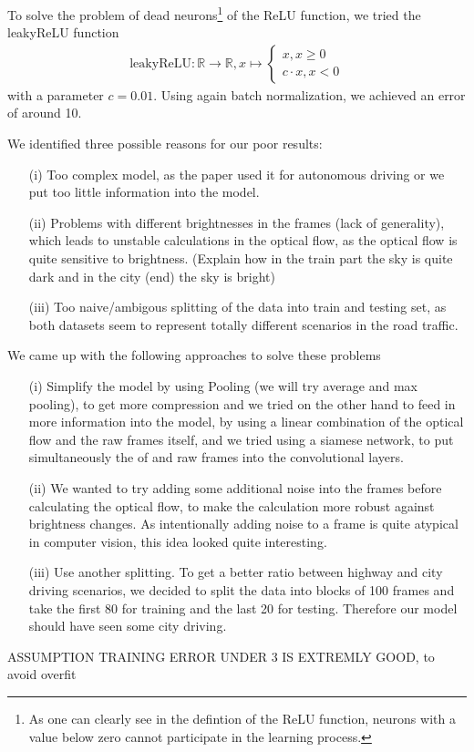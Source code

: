 \documentclass[conference]{IEEEtran}
\begin{document}
To solve the problem of dead neurons\footnote{As one can clearly see in the defintion of the ReLU 
function, neurons with a value below zero cannot participate in the learning process.} of the ReLU function, we 
tried the leakyReLU function
\begin{align*}
\mathrm{leakyReLU} : \mathbb{R} \to \mathbb{R}, x \mapsto \begin{cases}
x, x \geq 0\\
c \cdot x, x <0
\end{cases}
\end{align*}
with a parameter $c = 0.01$. Using again batch normalization, we achieved an error of around 10.

We identified three possible reasons for our poor results:
\begin{enumerate}
\item[(i)] Too complex model, as the paper used it for autonomous driving or we put too little information into the model.
\item[(ii)] Problems with different brightnesses in the frames (lack of generality), which leads to unstable calculations in the 
optical flow, as the optical flow is quite sensitive to brightness. (Explain how in the train part the sky is quite dark and in the 
city (end) the sky is bright)
\item[(iii)] Too naive/ambigous splitting of the data into train and testing set, as both datasets seem to represent totally different
scenarios in the road traffic.
\end{enumerate}
We came up with the following approaches to solve these problems
\begin{enumerate}
\item[(i)] Simplify the model by using Pooling (we will try average and max pooling), to get more compression and we tried on the
other hand to feed in more information into the model, by using a linear combination of the optical flow and the raw frames itself, and
we tried using a siamese network, to put simultaneously the of and raw frames into the convolutional layers.
\item[(ii)] We wanted to try adding some additional noise into the frames before calculating the optical flow, to make the calculation
more robust against brightness changes. As intentionally adding 
noise to a frame is quite atypical in computer vision, this idea looked quite interesting.
\item[(iii)] Use another splitting. To get a better ratio between highway and city driving scenarios, we decided to split the data into
blocks of 100 frames and take the first 80 for training and the last 20 for testing. Therefore our model should have seen some city
driving.
\end{enumerate}
ASSUMPTION TRAINING ERROR UNDER 3 IS EXTREMLY GOOD, to avoid overfit
\end{document}
